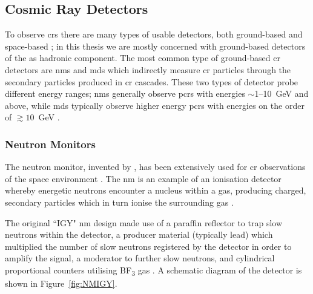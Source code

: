 \subsection{Cosmic Ray Detectors}

To observe \glspl{cr} there are many types of usable detectors, both ground-based and space-based \citep{schrijver_heliophysics_2010}; in this thesis we are mostly concerned with ground-based detectors of the \gls{as} hadronic component. The most common type of ground-based \gls{cr} detectors are \glspl{nm} and \glspl{md} which indirectly measure \gls{cr} particles through the secondary particles produced in \gls{cr} cascades. These two types of detector probe different energy ranges; \glspl{nm} generally observe \glspl{pcr} with energies $\sim$1--10~GeV and above, while \glspl{md} typically observe higher energy \glspl{pcr} with energies on the order of $\gtrsim10$~GeV \citep{kuwabara_real-time_2006, rockenbach_global_2014}.

\subsubsection*{Neutron Monitors}
The neutron monitor, invented by \cite{simpson_latitude_1948}, has been extensively used for \gls{cr} observations of the space environment \citep{clem_neutron_2000}. The \gls{nm} is an example of an ionisation detector whereby energetic neutrons encounter a nucleus within a gas, producing charged, secondary particles which in turn ionise the surrounding gas \citep{gloeckler_-situ_2010}.

The original ``IGY" \gls{nm} design made use of a paraffin reflector to trap slow neutrons within the detector, a producer material (typically lead) which multiplied the number of slow neutrons registered by the detector in order to amplify the signal, a moderator to further slow neutrons, and cylindrical proportional counters utilising BF\textsubscript{3} gas \citep{simpson_latitude_1948, simpson_cosmic_1953}. A schematic diagram of the detector is shown in Figure~\ref{fig:NMIGY}. %

